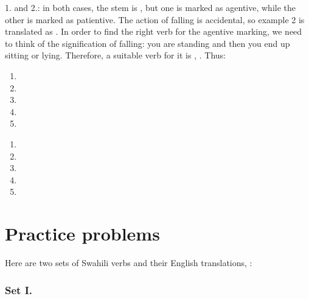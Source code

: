 \begin{refsection}
\begin{mysolution}
 1. and 2.: in both cases, the stem is , but one is marked as agentive, while the other is marked as patientive. The action of falling is accidental, so example 2 is translated as . In order to find the right verb for the agentive marking, we need to think of the signification of falling: you are standing and then you end up sitting or lying. Therefore, a suitable verb for it is , . Thus:

\begin{solutions}
\item
\begin{enumerate}
    \item {}
    \item {}
    \item {}
    \item {}
    \item {}
\end{enumerate}
\item
\begin{enumerate}[start = 6]
    \item {}
    \item {}
    \item {}
    \item {}
    \item {}
\end{enumerate}
\end{solutions}
\end{mysolution}
\hypertarget{practice-problems}{%
\section{Practice problems}}

\begin{problem}{\langnameSwahili}{\nameCSheard}{}
Here are two sets of Swahili verbs and their English translations, \OlympiadRandomOrder{}:\\
\renewcommand \chaosline [2]{\addtocounter{exx}{1}\arabic{exx}.&\cmubdata{#1}&\addtocounter{exxx}{1}\AlphAlph{\value{exxx}}.&\texttr{#2} \\[0.1em]}

\subsubsection*{Set I.}


\end{problem}
\end{refsection}
